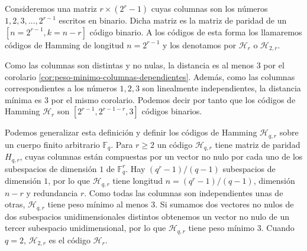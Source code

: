Consideremos una matriz \(r \times (2^r - 1)\) cuyas columnas son los números \(1, 2, 3, \dots, 2^{r-1}\) escritos en binario. 
Dicha matriz es la matriz de paridad de un \([n=2^{r-1}, k=n-r]\) código binario.
A los códigos de esta forma los llamaremos códigos de Hamming de longitud \(n = 2^{r-1}\) y los denotamos por \(\mathcal H_r\) o \(\mathcal H_{2,r}\).

Como las columnas son distintas y no nulas, la distancia es al menos \(3\) por el corolario \ref{cor:peso-minimo-columnas-dependientes}.
Además, como las columnas correspondientes a los números \(1, 2, 3\) son linealmente independientes, la distancia mínima es 3 por el mismo corolario.
Podemos decir por tanto que los códigos de Hamming \(\mathcal H_r\) son \([2^{r-1}, 2^{r-1-r}, 3]\) códigos binarios.

Podemos generalizar esta definición y definir los códigos de Hamming \(\mathcal H_{q,r}\) sobre un cuerpo finito arbitrario \(\mathbb F_q\). 
Para \(r \geq 2\) un código \(\mathcal H_{q,r}\) tiene matriz de paridad \(H_{q,r}\), cuyas columnas están compuestas por un vector no nulo por cada uno de los subespacios de dimensión \(1\) de \(\mathbb F_q^r\).
Hay \((q^r-1)/(q-1)\) subespacios de dimensión \(1\), por lo que \(\mathcal H_{q,r}\) tiene longitud \(n = (q^r-1)/(q-1)\), dimensión \(n-r\) y redundancia \(r\).
Como todas las columnas son independientes unas de otras, \(\mathcal H_{q,r}\) tiene peso mínimo al menos 3.
Si sumamos dos vectores no nulos de dos subespacios unidimensionales distintos obtenemos un vector no nulo de un tercer subespacio unidimensional, por lo que \(\mathcal H_{q,r}\) tiene peso mínimo 3. 
Cuando \(q = 2\), \(\mathcal H_{2,r}\) es el código \(\mathcal H_r\).